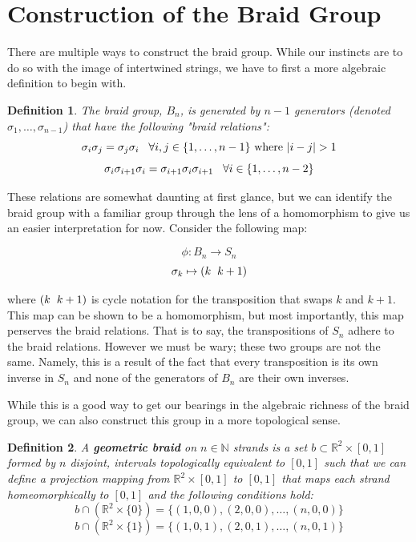 \documentclass[10pt]{ucthesis}
\newcommand{\R}{\mathbb{R}}
\newcommand{\N}{\mathbb{N}}
\newtheorem{definition}{Definition}[chapter]
\begin{document}
\section{Construction of the Braid Group}

There are multiple ways to construct the braid group. While our instincts are to do so with the image of intertwined strings, we have to first a more algebraic definition to begin with.

\begin{definition}
	The braid group, $B_n$, is generated by $n-1$ generators (denoted $\sigma_1,\hdots,\sigma_{n-1}$) that have the following "braid relations":
$$\sigma_i\sigma_j = \sigma_j\sigma_i \hspace{3mm} \forall i,j \in \{1,\hdots,n-1\} \text{ where } |i-j|>1$$
$$\sigma_i\sigma_{i+1}\sigma_i=\sigma_{i+1}\sigma_i\sigma_{i+1} \hspace{3mm} \forall i \in \{1,\hdots,n-2\}$$
\end{definition}

These relations are somewhat daunting at first glance, but we can identify the braid group with a familiar group through the lens of a homomorphism to give us an easier interpretation for now. Consider the following map:

$$\phi:B_n\rightarrow S_n$$
$$\sigma_k \mapsto (k \hspace{2mm} k+1)$$

\noindent where $(k \hspace{2mm}k+1)$ is cycle notation for the transposition that swaps $k$ and $k+1$. This map can be shown to be a homomorphism, but most importantly, this map perserves the braid relations. That is to say, the transpositions of $S_n$ adhere to the braid relations. However we must be wary; these two groups are not the same. Namely, this is a result of the fact that every transposition is its own inverse in $S_n$ and none of the generators of $B_n$ are their own inverses. 

While this is a good way to get our bearings in the algebraic richness of the braid group, we can also construct this group in a more topological sense.

\begin{definition}
	A \textbf{geometric braid} on $n\in \N$ strands is a set $b\subset\R^2\times [0,1]$ formed by $n$ disjoint, intervals topologically equivalent to $[0,1]$ such that we can define a projection mapping from $\R^2\times [0,1]$ to $[0,1]$ that maps each strand homeomorphically to $[0,1]$ and the following conditions hold:
$$b\cap(\R^2\times\{0\}) = \{(1,0,0),(2,0,0),\hdots,(n,0,0)\}$$
$$b\cap(\R^2\times\{1\}) = \{(1,0,1),(2,0,1),\hdots,(n,0,1)\}$$
\end{definition}
\end{document}
